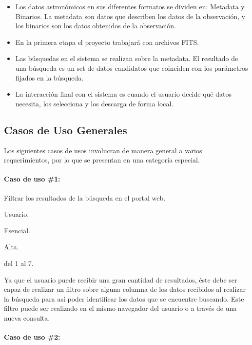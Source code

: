 \begin{itemize}
	\item Los datos astronómicos en sus diferentes formatos se dividen en: Metadata y Binarios. La metadata son datos que describen los datos de la observación, y los binarios son los datos obtenidos de la observación.
	\item En la primera etapa el proyecto trabajará con archivos FITS.
	\item Las búsquedas en el sistema se realizan sobre la metadata. El resultado de una búsqueda es un set de datos candidatos que coinciden con los parámetros fijados en la búsqueda.
	\item La interacción final con el sistema es cuando el usuario decide qué datos necesita, los selecciona y los descarga de forma local.
\end{itemize}

\subsection*{Casos de Uso Generales}

Los siguientes casos de usos involucran de manera general a varios requerimientos, por lo que se presentan en una categoría especial. 

\paragraph{Caso de uso \#1:}

\begin{description}[noitemsep]
	\item[Objetivo] Filtrar los resultados de la búsqueda en el portal web.
        \item[Actor] Usuario.
        \item[Necesidad] Esencial.
        \item[Prioridad] Alta.
        \item[Requerimientos Referenciados] del 1 al 7.
        \item[Descripción] Ya que el usuario puede recibir una gran cantidad de resultados, éste debe ser capaz de realizar un filtro sobre alguna columna de los datos recibidos al realizar la búsqueda para así poder identificar los datos que se encuentre buscando. Este filtro puede ser realizado en el mismo navegador del usuario o a través de una nueva consulta. 
\end{description}

\paragraph{Caso de uso \#2:}

